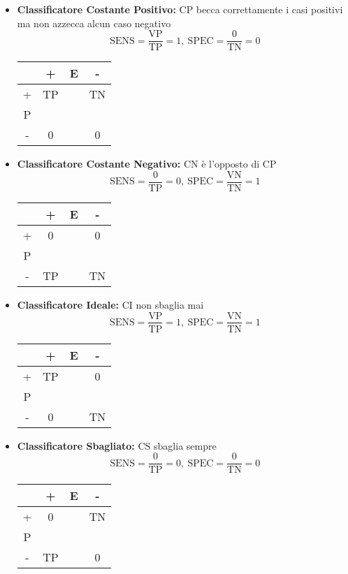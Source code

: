 \documentclass[11pt]{report}
\begin{document}
\begin{itemize}
	\item \textbf{Classificatore Costante Positivo:} $\text{CP}$ becca correttamente i casi positivi ma non azzecca alcun caso negativo
	$$\text{SENS} = \frac{\text{VP}}{\text{TP}} = 1,\ \text{SPEC} = \frac{0}{\text{TN}} = 0$$
	\begin{center}
	\begin{tabular}{ c| c c c }
		& + & E & - \\
		\hline
		+ & TP & & TN \\
		P \\
		- & 0 & & 0
	\end{tabular}
	\end{center}
	\item \textbf{Classificatore Costante Negativo:} $\text{CN}$ è l'opposto di $\text{CP}$
	$$\text{SENS} = \frac{0}{\text{TP}} = 0,\ \text{SPEC} = \frac{\text{VN}}{\text{TN}} = 1$$
	\begin{center}
	\begin{tabular}{ c| c c c }
		& + & E & - \\
		\hline
		+ & 0 & & 0 \\
		P \\
		- & TP & & TN
	\end{tabular}
	\end{center}
	\item \textbf{Classificatore Ideale:} $\text{CI}$ non sbaglia mai
	$$\text{SENS} = \frac{\text{VP}}{\text{TP}} = 1,\ \text{SPEC} = \frac{\text{VN}}{\text{TN}} = 1$$
	\begin{center}
	\begin{tabular}{ c| c c c }
		& + & E & - \\
		\hline
		+ & TP & & 0 \\
		P \\
		- & 0 & & TN
	\end{tabular}
	\end{center}
	\item \textbf{Classificatore Sbagliato:} $\text{CS}$ sbaglia sempre
	$$\text{SENS} = \frac{0}{\text{TP}} = 0,\ \text{SPEC} = \frac{0}{\text{TN}} = 0$$
	\begin{center}
	\begin{tabular}{ c| c c c }
		& + & E & - \\
		\hline
		+ & 0 & & TN \\
		P \\
		- & TP & & 0
	\end{tabular}
	\end{center}

\end{itemize}
\end{document}
